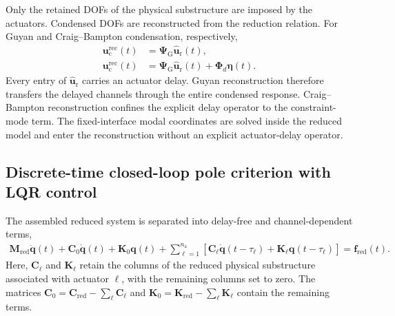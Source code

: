 \documentclass[11pt]{article}
\newenvironment{revision}{\begingroup\color{red}}{\endgroup}
\begin{document}
\begin{revision}
Only the retained DOFs of the physical substructure are imposed by the actuators. Condensed DOFs are reconstructed from the reduction relation. For Guyan and Craig--Bampton condensation, respectively,
\end{revision}
\begin{subequations}
\label{eq:delay-recovery}
\begin{align}
    \bm{u}_{\mathrm{c}}^{\mathrm{rec}}(t)
    &=\bm{\Psi}_{\mathrm{G}}\hat{\bm{u}}_{\mathrm{r}}(t),
    \label{eq:delay-recovery-guyan}\\
    \bm{u}_{\mathrm{c}}^{\mathrm{rec}}(t)
    &=\bm{\Psi}_{\mathrm{G}}\hat{\bm{u}}_{\mathrm{r}}(t)
    +\bm{\Phi}_{d}\bm{\eta}(t).
    \label{eq:delay-recovery-cb}
\end{align}
\end{subequations}
\begin{revision}
Every entry of \(\hat{\bm{u}}_{\mathrm{r}}\) carries an actuator delay. Guyan reconstruction therefore transfers the delayed channels through the entire condensed response. Craig--Bampton reconstruction confines the explicit delay operator to the constraint-mode term. The fixed-interface modal coordinates are solved inside the reduced model and enter the reconstruction without an explicit actuator-delay operator.
\end{revision}

\subsection{Discrete-time closed-loop pole criterion with LQR control}\label{sec:pole-criterion}

The assembled reduced system is separated into delay-free and channel-dependent terms,
\begin{equation}
\begin{split}
    \mathbf{M}_{\mathrm{red}}\ddot{\bm{q}}(t)
    +\mathbf{C}_{0}\dot{\bm{q}}(t)
    +\mathbf{K}_{0}\bm{q}(t)
    +\sum_{\ell=1}^{n_{\mathrm{a}}}
    \left[
    \mathbf{C}_{\ell}\dot{\bm{q}}(t-\tau_{\ell})
    +\mathbf{K}_{\ell}\bm{q}(t-\tau_{\ell})
    \right]
    =\bm{f}_{\mathrm{red}}(t).
\end{split}
\label{eq:delayed-reduced-system}
\end{equation}
Here, \(\mathbf{C}_{\ell}\) and \(\mathbf{K}_{\ell}\) retain the columns of the reduced physical substructure associated with actuator \(\ell\), with the remaining columns set to zero. The matrices \(\mathbf{C}_{0}=\mathbf{C}_{\mathrm{red}}-\sum_{\ell}\mathbf{C}_{\ell}\) and \(\mathbf{K}_{0}=\mathbf{K}_{\mathrm{red}}-\sum_{\ell}\mathbf{K}_{\ell}\) contain the remaining terms.
\end{document}
